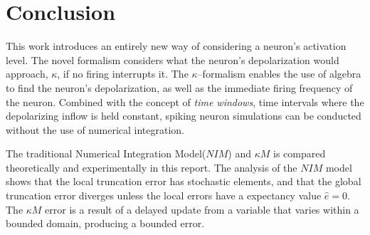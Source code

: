 \section{Conclusion}

	This work introduces an entirely new way of considering a neuron's activation level.
	The novel formalism considers what the neuron's depolarization would approach, $\kappa$, if no firing interrupts it.
	The $\kappa$--formalism enables the use of algebra to find the neuron's depolarization, as well as the immediate firing frequency of the neuron.
	Combined with the concept of \emph{time windows}, time intervals where the depolarizing inflow is held constant, spiking neuron simulations can be conducted without the use of numerical integration.



	The traditional Numerical Integration Model($NIM$) and $\kappa M$ is compared theoretically and experimentally in this report. %
	The analysis of the $NIM$ model shows that the local truncation error has stochastic elements, and that the global truncation error diverges unless the local errors have a expectancy value $\hat{e} = 0$. %
	The $\kappa M$ error is a result of a delayed update from a variable that varies within a bounded domain, producing a bounded error. %


